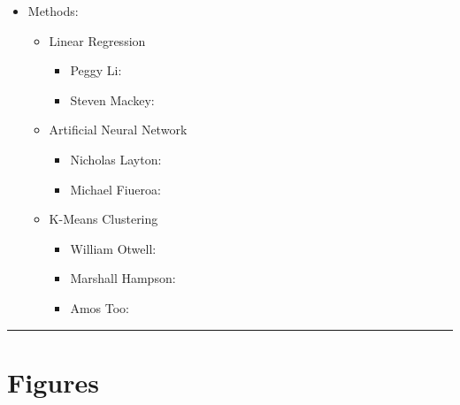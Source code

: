 \documentclass[12pt]{article}
\newcommand{\horizontalLine}{
	\begin{center}
		\hrule width 1.0\textwidth
	\end{center}
}
\begin{document}
\begin{itemize}
    \item Methods:
    \begin{itemize}
        \item Linear Regression
        \begin{itemize}
            \item Peggy Li:
            \item Steven Mackey:
        \end{itemize}
        \item Artificial Neural Network
        \begin{itemize}
            \item Nicholas Layton:
            \item Michael Fiueroa:
        \end{itemize}
        \item K-Means Clustering
        \begin{itemize}
            \item William Otwell:
            \item Marshall Hampson:
            \item Amos Too:
        \end{itemize}
    \end{itemize}
\end{itemize}

\horizontalLine
\appendix
\section{Figures}
\label{sec:figures}
\end{document}
